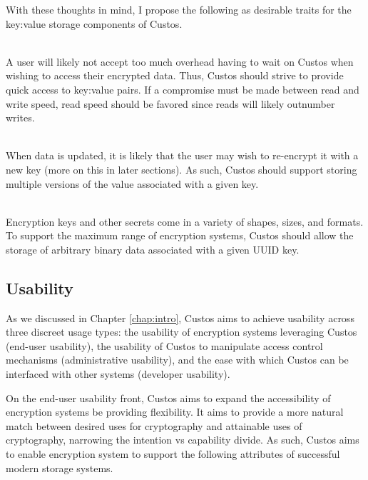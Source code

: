 With these thoughts in mind, I propose the following as desirable
traits for the key:value storage components of Custos.

\begin{packed_desc}
\item[Fast Access] \hfill \\ A user will likely not accept too much
  overhead having to wait on Custos when wishing to access their
  encrypted data. Thus, Custos should strive to provide quick access
  to key:value pairs. If a compromise must be made between read and
  write speed, read speed should be favored since reads will likely
  outnumber writes.
\item[Versioned Data] \hfill \\ When data is updated, it is likely
  that the user may wish to re-encrypt it with a new key (more on this
  in later sections). As such, Custos should support storing multiple
  versions of the value associated with a given key.
\item[Arbitrary Data] \hfill \\ Encryption keys and other secrets come
  in a variety of shapes, sizes, and formats. To support the maximum
  range of encryption systems, Custos should allow the storage of
  arbitrary binary data associated with a given UUID key.
\end{packed_desc}

\subsection{Usability}

As we discussed in Chapter \ref{chap:intro}, Custos aims to achieve
usability across three discreet usage types: the usability of
encryption systems leveraging Custos (end-user usability), the
usability of Custos to manipulate access control mechanisms
(administrative usability), and the ease with which Custos can be
interfaced with other systems (developer usability).

On the end-user usability front, Custos aims to expand the
accessibility of encryption systems be providing flexibility. It aims
to provide a more natural match between desired uses for cryptography
and attainable uses of cryptography, narrowing the intention vs
capability divide. As such, Custos aims to enable encryption system to
support the following attributes of successful modern storage systems.

